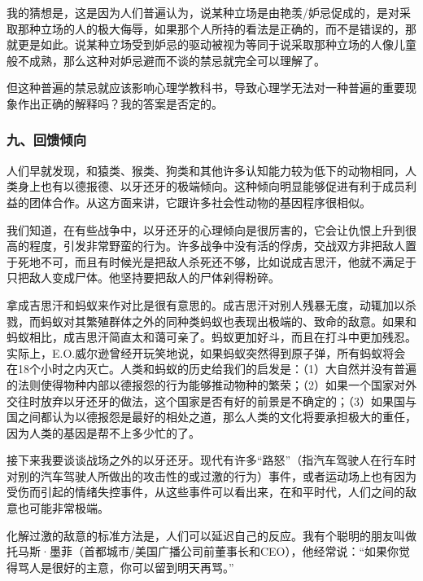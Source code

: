 我的猜想是，这是因为人们普遍认为，说某种立场是由艳羡/妒忌促成的，是对采取那种立场的人的极大侮辱，如果那个人所持的看法是正确的，而不是错误的，那就更是如此。说某种立场受到妒忌的驱动被视为等同于说采取那种立场的人像儿童般不成熟，那么这种对妒忌避而不谈的禁忌就完全可以理解了。
\par

但这种普遍的禁忌就应该影响心理学教科书，导致心理学无法对一种普遍的重要现象作出正确的解释吗？我的答案是否定的。
\par

\subsubsection*{九、回馈倾向}

人们早就发现，和猿类、猴类、狗类和其他许多认知能力较为低下的动物相同，人类身上也有以德报德、以牙还牙的极端倾向。这种倾向明显能够促进有利于成员利益的团体合作。从这方面来讲，它跟许多社会性动物的基因程序很相似。
\par

我们知道，在有些战争中，以牙还牙的心理倾向是很厉害的，它会让仇恨上升到很高的程度，引发非常野蛮的行为。许多战争中没有活的俘虏，交战双方非把敌人置于死地不可，而且有时候光是把敌人杀死还不够，比如说成吉思汗，他就不满足于只把敌人变成尸体。他坚持要把敌人的尸体剁得粉碎。
\par

拿成吉思汗和蚂蚁来作对比是很有意思的。成吉思汗对别人残暴无度，动辄加以杀戮，而蚂蚁对其繁殖群体之外的同种类蚂蚁也表现出极端的、致命的敌意。如果和蚂蚁相比，成吉思汗简直太和蔼可亲了。蚂蚁更加好斗，而且在打斗中更加残忍。实际上，E.O.威尔逊曾经开玩笑地说，如果蚂蚁突然得到原子弹，所有蚂蚁将会在18个小时之内灭亡。人类和蚂蚁的历史给我们的启发是：（1）大自然并没有普遍的法则使得物种内部以德报怨的行为能够推动物种的繁荣；（2）如果一个国家对外交往时放弃以牙还牙的做法，这个国家是否有好的前景是不确定的；（3）如果国与国之间都认为以德报怨是最好的相处之道，那么人类的文化将要承担极大的重任，因为人类的基因是帮不上多少忙的了。
\par

接下来我要谈谈战场之外的以牙还牙。现代有许多“路怒”（指汽车驾驶人在行车时对别的汽车驾驶人所做出的攻击性的或过激的行为）事件，或者运动场上也有因为受伤而引起的情绪失控事件，从这些事件可以看出来，在和平时代，人们之间的敌意也可能非常极端。
\par

化解过激的敌意的标准方法是，人们可以延迟自己的反应。我有个聪明的朋友叫做托马斯·墨菲（首都城市/美国广播公司前董事长和CEO），他经常说：“如果你觉得骂人是很好的主意，你可以留到明天再骂。”
\par

